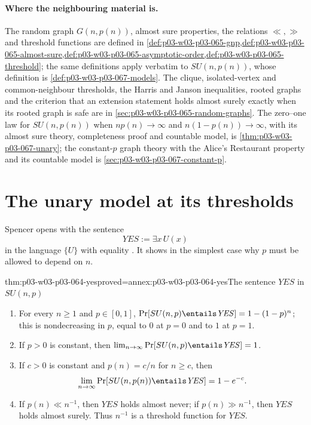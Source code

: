 \paragraph{Where the neighbouring material is.}
The random graph \(G(n,p(n))\), almost sure properties, the relations
\(\ll,\gg\) and threshold functions are defined in
\cref{def:p03-w03-p03-065-gnp,def:p03-w03-p03-065-almost-sure,def:p03-w03-p03-065-asymptotic-order,def:p03-w03-p03-065-threshold};
the same definitions apply verbatim to \(SU(n,p(n))\), whose definition is
\cref{def:p03-w03-p03-067-models}.  The clique, isolated-vertex and
common-neighbour thresholds, the Harris and Janson inequalities, rooted
graphs and the criterion that an extension statement holds almost surely
exactly when its rooted graph is safe are in
\cref{sec:p03-w03-p03-065-random-graphs}.  The zero--one law for
\(SU(n,p(n))\) when \(np(n)\to\infty\) and \(n(1-p(n))\to\infty\), with its
almost sure theory, completeness proof and countable model, is
\cref{thm:p03-w03-p03-067-unary}; the constant-\(p\) graph theory with the
Alice's Restaurant property and its countable model is
\cref{sec:p03-w03-p03-067-constant-p}.

\section{The unary model at its thresholds}
\label{sec:p03-w03-p03-064-unary}

Spencer opens with the sentence
\[
  \mathit{YES}:=\exists x\,U(x)
\]
in the language \(\{U\}\) with equality \cite[p.~1]{Spencer2007LogicRandomStructuresAuthor}.
It shows in the simplest case why \(p\) must be allowed to depend on \(n\).

\begin{hbtheorem}{thm:p03-w03-p03-064-yes}{proved=annex:p03-w03-p03-064-yes}{The sentence \(\mathit{YES}\) in \(SU(n,p)\)}
\begin{enumerate}
\item For every \(n\geq1\) and \(p\in[0,1]\),
  \(\Pr[SU(n,p)\entails\mathit{YES}]=1-(1-p)^n\); this is nondecreasing in
  \(p\), equal to \(0\) at \(p=0\) and to \(1\) at \(p=1\).
\item If \(p>0\) is constant, then
  \(\lim_{n\to\infty}\Pr[SU(n,p)\entails\mathit{YES}]=1\).
\item If \(c>0\) is constant and \(p(n)=c/n\) for \(n\geq c\), then
  \[
    \lim_{n\to\infty}\Pr[SU(n,p(n))\entails\mathit{YES}]=1-e^{-c}.
  \]
\item If \(p(n)\ll n^{-1}\), then \(\mathit{YES}\) holds almost never; if
  \(p(n)\gg n^{-1}\), then \(\mathit{YES}\) holds almost surely.  Thus
  \(n^{-1}\) is a threshold function for \(\mathit{YES}\).
\end{enumerate}
\end{hbtheorem}


